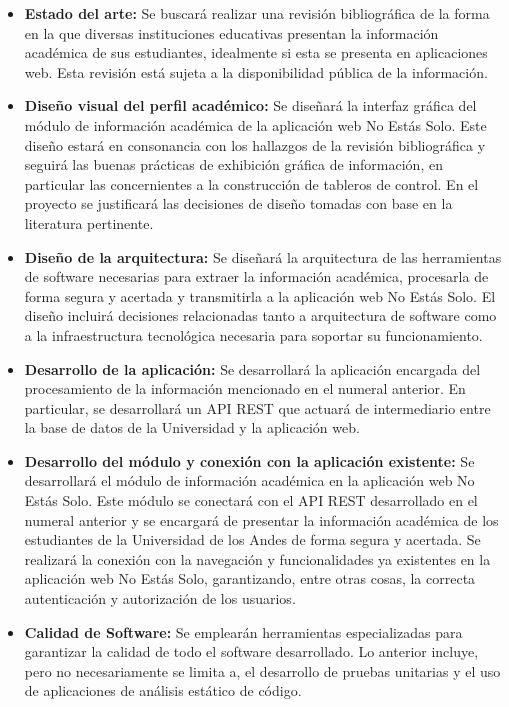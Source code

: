\documentclass{fmbproyectogrado}
\begin{document}
\begin{itemize}
  \item \textbf{Estado del arte:} Se buscará realizar una revisión bibliográfica de la forma en la que diversas instituciones educativas presentan la información académica de sus estudiantes, idealmente si esta se presenta en aplicaciones web. Esta revisión está sujeta a la disponibilidad pública de la información.
  \item \textbf{Diseño visual del perfil académico:} Se diseñará la interfaz gráfica del módulo de información académica de la aplicación web No Estás Solo. Este diseño estará en consonancia con los hallazgos de la revisión bibliográfica y seguirá las buenas prácticas de exhibición gráfica de información, en particular las concernientes a la construcción de tableros de control. En el proyecto se justificará las decisiones de diseño tomadas con base en la literatura pertinente.
  \item \textbf{Diseño de la arquitectura:} Se diseñará la arquitectura de las herramientas de software necesarias para extraer la información académica, procesarla de forma segura y acertada y transmitirla a la aplicación web No Estás Solo. El diseño incluirá decisiones relacionadas tanto a arquitectura de software como a la infraestructura tecnológica necesaria para soportar su funcionamiento.
  \item \textbf{Desarrollo de la aplicación:} Se desarrollará la aplicación encargada del procesamiento de la información mencionado en el numeral anterior. En particular, se desarrollará un API REST que actuará de intermediario entre la base de datos de la Universidad y la aplicación web.
  \item \textbf{Desarrollo del módulo y conexión con la aplicación existente:} Se desarrollará el módulo de información académica en la aplicación web No Estás Solo. Este módulo se conectará con el API REST desarrollado en el numeral anterior y se encargará de presentar la información académica de los estudiantes de la Universidad de los Andes de forma segura y acertada. Se realizará la conexión con la navegación y funcionalidades ya existentes en la aplicación web No Estás Solo, garantizando, entre otras cosas, la correcta autenticación y autorización de los usuarios.
  \item \textbf{Calidad de Software:} Se emplearán herramientas especializadas para garantizar la calidad de todo el software desarrollado. Lo anterior incluye, pero no necesariamente se limita a, el desarrollo de pruebas unitarias y el uso de aplicaciones de análisis estático de código.

\end{itemize}
\end{document}
